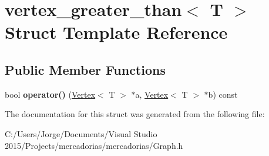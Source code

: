 \hypertarget{structvertex__greater__than}{}\section{vertex\+\_\+greater\+\_\+than$<$ T $>$ Struct Template Reference}
\label{structvertex__greater__than}
\subsection*{Public Member Functions}
\begin{DoxyCompactItemize}
\item 
bool {\bfseries operator()} (\hyperlink{class_vertex}{Vertex}$<$ T $>$ $\ast$a, \hyperlink{class_vertex}{Vertex}$<$ T $>$ $\ast$b) const \hypertarget{structvertex__greater__than_af58940d572829488c2915ca53663631e}{}\label{structvertex__greater__than_af58940d572829488c2915ca53663631e}

\end{DoxyCompactItemize}


The documentation for this struct was generated from the following file\+:\begin{DoxyCompactItemize}
\item 
C\+:/\+Users/\+Jorge/\+Documents/\+Visual Studio 2015/\+Projects/mercadorias/mercadorias/Graph.\+h\end{DoxyCompactItemize}
